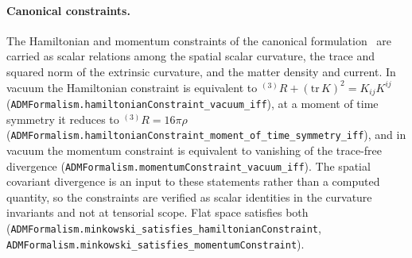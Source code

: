 \documentclass[aps,prd,nofootinbib,superscriptaddress,12pt]{revtex4-2}
\DeclareRobustCommand{\lb}{\discretionary{}{}{}}
\begin{document}
\paragraph{Canonical constraints.}
The Hamiltonian and momentum constraints of the canonical
formulation~\cite{ADM1962} are carried as scalar relations among the spatial
scalar curvature, the trace and squared norm of the extrinsic curvature, and the
matter density and current. In vacuum the Hamiltonian constraint is equivalent to
$^{(3)}R + (\mathrm{tr}\,K)^2 = K_{ij}K^{ij}$
(\texttt{ADMFormalism.\lb{}hamiltonian\lb{}Constraint\_\lb{}vacuum\_\lb{}iff}), at a moment of time
symmetry it reduces to $^{(3)}R = 16\pi\rho$
(\texttt{ADMFormalism.\lb{}hamiltonian\lb{}Constraint\_\lb{}moment\_\lb{}of\_\lb{}time\_\lb{}symmetry\_\lb{}iff}), and
in vacuum the momentum constraint is equivalent to vanishing of the trace-free
divergence (\texttt{ADMFormalism.\lb{}momentum\lb{}Constraint\_\lb{}vacuum\_\lb{}iff}). The spatial
covariant divergence is an input to these statements rather than a computed
quantity, so the constraints are verified as scalar identities in the curvature
invariants and not at tensorial scope. Flat space satisfies both
(\texttt{ADMFormalism.\lb{}minkowski\_\lb{}satisfies\_\lb{}hamiltonian\lb{}Constraint},
\texttt{ADMFormalism.\lb{}minkowski\_\lb{}satisfies\_\lb{}momentum\lb{}Constraint}).
\end{document}
